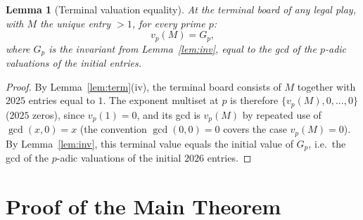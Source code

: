 \documentclass{article}
\newtheorem{lemma}[theorem]{Lemma}
\begin{document}
\begin{lemma}[Terminal valuation equality]\label{lem:termval}
At the terminal board of any legal play, with $M$ the unique entry $>1$,
for every prime $p$:
\[
v_p(M)=G_p,
\]
where $G_p$ is the invariant from Lemma~\ref{lem:inv}, equal to the gcd of the
$p$-adic valuations of the \emph{initial} entries.
\end{lemma}
\begin{proof}
By Lemma~\ref{lem:term}(iv), the terminal board consists of $M$ together with $2025$ entries
equal to $1$. The exponent multiset at $p$ is therefore $\{v_p(M),0,\dots,0\}$ ($2025$ zeros),
since $v_p(1)=0$, and its gcd is $v_p(M)$ by repeated use of $\gcd(x,0)=x$ (the convention
$\gcd(0,0)=0$ covers the case $v_p(M)=0$). By Lemma~\ref{lem:inv}, this terminal value equals
the initial value of $G_p$, i.e.\ the gcd of the $p$-adic valuations of the initial $2026$
entries.
\end{proof}

\section{Proof of the Main Theorem}
\end{document}
